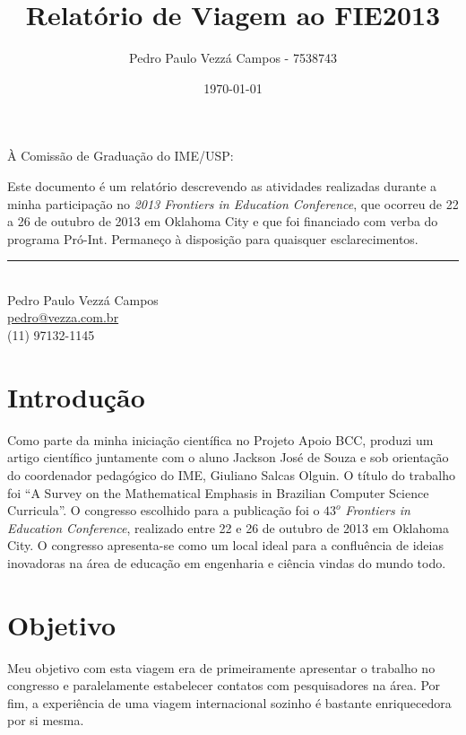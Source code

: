 \documentclass{article}
\begin{document}
\title{Relatório de Viagem ao FIE2013}
\author{Pedro Paulo Vezzá Campos - 7538743}
\date{\today}

\maketitle


\hfill À Comissão de Graduação do IME/USP:\\

\vspace{1cm}

Este documento é um relatório descrevendo as atividades realizadas durante a minha participação no \emph{2013 Frontiers in Education Conference}, que ocorreu de 22 a 26 de outubro de 2013 em Oklahoma City e que foi financiado com verba do programa Pró-Int. Permaneço à disposição para quaisquer esclarecimentos.

\vfill

\begin{flushright}
	\noindent\rule{8cm}{0.4pt} \\
	Pedro Paulo Vezzá Campos\\
	\url{pedro@vezza.com.br}\\
	(11) 97132-1145\\
\end{flushright}

\newpage

\section{Introdução}
Como parte da minha iniciação científica no Projeto Apoio BCC, produzi um artigo científico juntamente com o aluno Jackson José de Souza e sob orientação do coordenador pedagógico do IME, Giuliano Salcas Olguin. O título do trabalho foi ``A Survey on the Mathematical Emphasis in Brazilian Computer Science Curricula''. O congresso escolhido para a publicação foi o $43^o$ \emph{Frontiers in Education Conference}, realizado entre 22 e 26 de outubro de 2013 em Oklahoma City. O congresso apresenta-se como um local ideal para a confluência de ideias inovadoras na área de educação em engenharia e ciência vindas do mundo todo.

\section{Objetivo}
Meu objetivo com esta viagem era de primeiramente apresentar o trabalho no congresso e paralelamente estabelecer contatos com pesquisadores na área. Por fim, a experiência de uma viagem internacional sozinho é bastante enriquecedora por si mesma.
\end{document}
